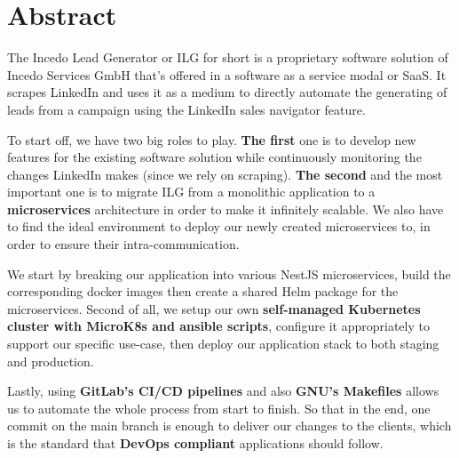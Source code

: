 \section*{Abstract}
The Incedo Lead Generator or ILG for short is a proprietary software solution of Incedo Services GmbH that's offered in a software as a service modal or SaaS.
It scrapes LinkedIn and uses it as a medium to directly automate the generating of leads from a campaign using the LinkedIn sales navigator feature.

\medskip
\noindent To start off, we have two big roles to play.
\textbf{The first} one is to develop new features for the existing software solution while continuously monitoring the changes LinkedIn makes (since we rely on scraping).
\textbf{The second} and the most important one is to migrate ILG from a monolithic application to a \textbf{microservices} architecture in order to make it infinitely scalable. We also have to find the ideal environment to deploy our newly created microservices to, in order to ensure their intra-communication.

\medskip
\noindent We start by breaking our application into various NestJS microservices, build the corresponding docker images then create a shared Helm package for the microservices. Second of all, we setup our own \textbf{self-managed Kubernetes cluster with MicroK8s and ansible scripts}, configure it appropriately to support our specific use-case, then deploy our application stack to both staging and production.

\medskip
\noindent Lastly, using \textbf{GitLab's CI/CD pipelines} and also \textbf{GNU's Makefiles} allows us to automate the whole process from start to finish. So that in the end, one commit on the main branch is enough to deliver our changes to the clients, which is the standard that \textbf{DevOps compliant} applications should follow.

\newpage
